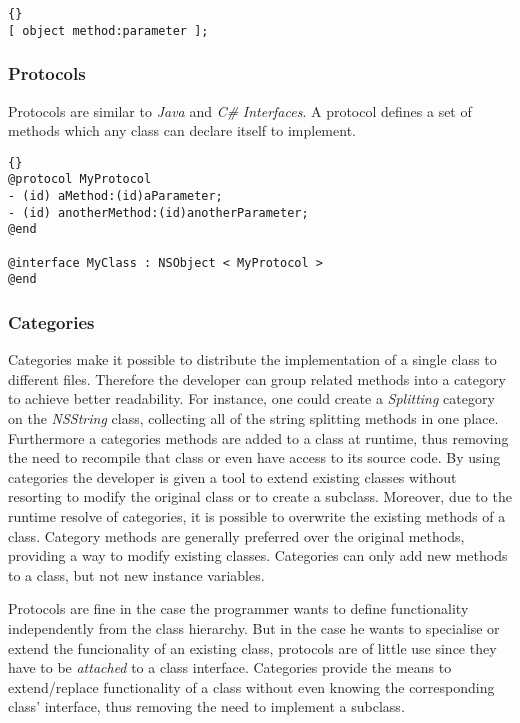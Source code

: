\lstset{language=[Objective]C}
\begin{lstlisting}[captionpos=b, caption=An Objective-C message send,
label=lst_objcmsgsend]{}
[ object method:parameter ];
\end{lstlisting}

\subsubsection{Protocols}
Protocols are similar to \textit{Java} and \textit{C\#} \textit{Interfaces}.
A protocol defines a set of methods which any class can declare itself to
implement.

\lstset{language=[Objective]C}
\begin{lstlisting}[captionpos=b, caption=An Objective-C protocol and a
class adopting it.,
label=lst_objcprotocol]{}
@protocol MyProtocol
- (id) aMethod:(id)aParameter;
- (id) anotherMethod:(id)anotherParameter;
@end

@interface MyClass : NSObject < MyProtocol >
@end
\end{lstlisting}

\subsubsection{Categories}

Categories make it possible to distribute the implementation of a single class
to different files. Therefore the developer can group related methods into a
category to achieve better readability. For instance, one could create a
\textit{Splitting} category on the \textit{NSString} class, collecting all of
the string splitting methods in one place.
Furthermore a categories methods are added to a class at runtime, thus
removing the need to recompile that class or even have access to its source
code. By using categories the developer is given a tool to extend existing
classes without resorting to modify the original class or to create a subclass.
Moreover, due to the runtime resolve of categories, it is possible to overwrite
the existing methods of a class. Category methods are generally preferred over
the original methods, providing a way to modify existing classes.
Categories can only add new methods to a class, but not new instance variables.

Protocols are fine in the case the programmer wants to define functionality
independently from the class hierarchy. But in the case he wants to specialise
or extend the funcionality of an existing class, protocols are of little use
since they have to be \textit{attached} to a class interface. Categories
provide the means to extend/replace functionality of a class without even
knowing the corresponding class' interface, thus removing the need to
implement a subclass.

